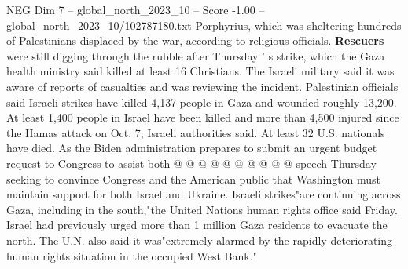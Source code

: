 \begin{textsample}{NEG Dim 7 – global\_north\_2023\_10 – Score -1.00 – global\_north\_2023\_10/102787180.txt}
Porphyrius, which was sheltering hundreds of Palestinians displaced by the war, according to religious officials. \textbf{Rescuers} were still digging through the rubble after Thursday ' s strike, which the Gaza health ministry said killed at least 16 Christians.
The Israeli military said it was aware of reports of casualties and was reviewing the incident.
Palestinian officials said Israeli strikes have killed 4,137 people in Gaza and wounded roughly 13,200.
At least 1,400 people in Israel have been killed and more than 4,500 injured since the Hamas attack on Oct. 7, Israeli authorities said.
At least 32 U.S. nationals have died.
As the Biden administration prepares to submit an urgent budget request to Congress to assist both @ @ @ @ @ @ @ @ @ @ speech Thursday seeking to convince Congress and the American public that Washington must maintain support for both Israel and Ukraine.
Israeli strikes"are continuing across Gaza, including in the south,"the United Nations human rights office said Friday.
Israel had previously urged more than 1 million Gaza residents to evacuate the north.
The U.N. also said it was"extremely alarmed by the rapidly deteriorating human rights situation in the occupied West Bank."

\end{textsample}
